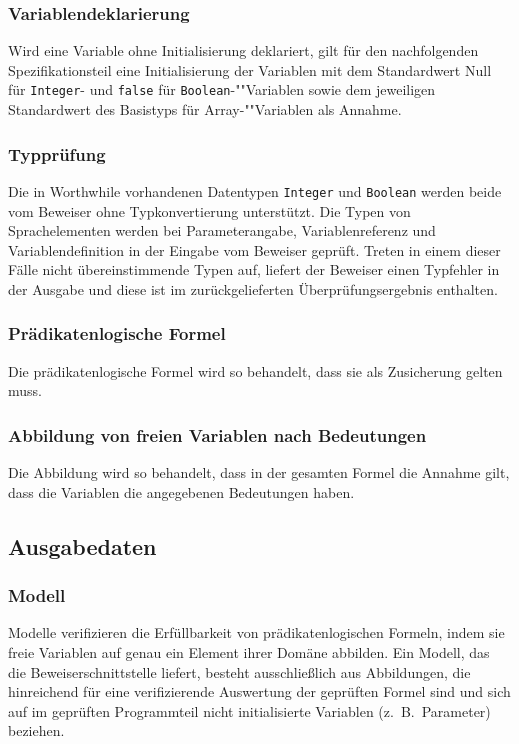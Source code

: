 \subsubsection{Variablendeklarierung}%

Wird eine Variable ohne Initialisierung deklariert, gilt für den
nachfolgenden Spezifikationsteil eine Initialisierung der Variablen
mit dem Standardwert Null für \texttt{Integer}- und \texttt{false} für
\texttt{Boolean}-""Variablen sowie dem jeweiligen Standardwert des
Basistyps für Array-""Variablen als Annahme.%

\subsubsection{Typprüfung}%

Die in Worthwhile vorhandenen Datentypen \texttt{Integer} und
\texttt{Boolean} werden beide vom Beweiser ohne Typkonvertierung
unterstützt. Die Typen von Sprachelementen werden bei Parameterangabe,
Variablenreferenz und Variablendefinition in der Eingabe vom Beweiser
geprüft. Treten in einem dieser Fälle nicht übereinstimmende Typen
auf, liefert der Beweiser einen Typfehler in der Ausgabe und diese ist
im zurückgelieferten Überprüfungsergebnis enthalten.%

\subsubsection{Prädikatenlogische Formel}%

Die prädikatenlogische Formel wird so behandelt, dass sie als
Zusicherung gelten muss.%

\subsubsection{Abbildung von freien Variablen nach Bedeutungen}%

Die Abbildung wird so behandelt, dass in der gesamten Formel die
Annahme gilt, dass die Variablen die angegebenen Bedeutungen haben.%

\subsection{Ausgabedaten}%

\subsubsection{Modell}%

Modelle verifizieren die Erfüllbarkeit von prädikatenlogischen
Formeln, indem sie freie Variablen auf genau ein Element ihrer Domäne
abbilden. Ein Modell, das die Beweiserschnittstelle liefert, besteht
ausschließlich aus Abbildungen, die hinreichend für eine
verifizierende Auswertung der geprüften Formel sind und sich auf im
geprüften Programmteil nicht initialisierte Variablen (z.~B.\
Parameter) beziehen.%

